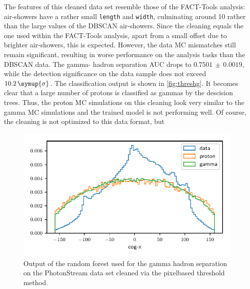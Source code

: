 The features of this cleaned data set resemble those of the FACT-Tools
analysis: air-showers have a rather small \texttt{length} and \texttt{width},
culminating around \num{10} rather than the large values of the DBSCAN
air-showers. Since the cleaning equals the one used within the FACT-Tools
analysis, apart from a small offset due to brighter air-showers, this is
expected. However, the data MC mismatches still remain significant, resulting
in worse performance on the analysis tasks than the DBSCAN data. The gamma-
hadron separation AUC drops to $0.7501\,\pm\,0.0019$, while the detection
significance on the data sample does not exceed $10.2\,\symup{\sigma}$. The
classification output is shown in \autoref{fig:threshg}. It becomes clear that
a large number of protons is classified as gammas by the descision trees. Thus,
the proton MC simulations on this cleaning look very similar to the gamma MC
simulations and the trained model is not performing well. Of course, the
cleaning is not optimized to this data format, but
%
\begin{figure}
  \centering
  \includegraphics[width=\textwidth, page=5]{Plots/data_mc/features_thresh.pdf}
  \caption{Output of the random forest used for the gamma hadron separation on the PhotonStream data set cleaned via the pixelbased threshold method.}
  \label{fig:threshg}
\end{figure}
